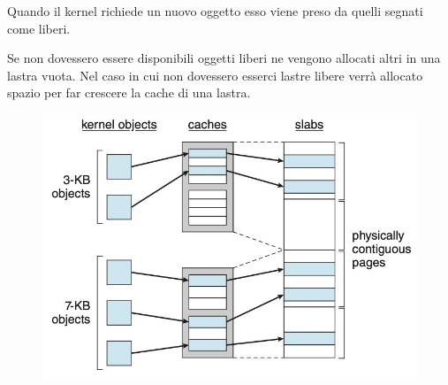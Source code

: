 \spacer
Quando il kernel richiede un nuovo oggetto esso viene preso da quelli segnati come liberi.

Se non dovessero essere disponibili oggetti liberi ne vengono allocati altri in una lastra vuota. Nel caso in cui non dovessero esserci lastre libere verrà allocato spazio per far crescere la cache di una lastra.

\begin{figure}[H]
    \centering
    \includegraphics[width=0.5\linewidth]{assets/allocatore-lastra.jpg}
\end{figure}
